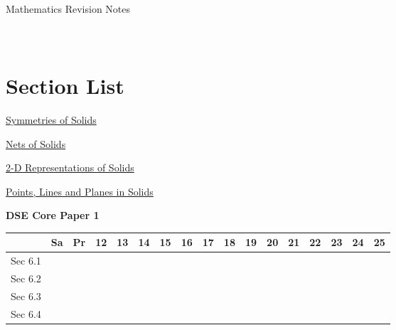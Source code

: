 \documentclass[12pt, a4paper]{article}
\begin{document}
\newpage
\newpage
\thispagestyle{empty}
\begin{center}
Mathematics Revision Notes\\\vspace{1cm}
\\\vspace{1cm}
{\fontsize{24pt}{24pt}\selectfont {More about 3-D Figures}} \\\vspace{1cm}
\label{chapter:S3-6}

\end{center}
\vspace{0.5cm}
\hline
\section*{Section List}
\begin{enumx}[label=Sec 6.\arabic*\ ]
\item \hyperref[section:3-6-1]{Symmetries of Solids}
\item \hyperref[section:3-6-2]{Nets of Solids}
\item \hyperref[section:3-6-3]{2-D Representations of Solids}
\item \hyperref[section:3-6-4]{Points, Lines and Planes in Solids}
\end{enumx}
\begin{absolutelynopagebreak}
\begin{center}
\textbf{DSE Core Paper 1}
\end{center}
\begin{center}
\begin{tabular}{|l|c|c|c|c|c|c|c|c|c|c|c|c|c|c|c|c|}
\hline
        & Sa & Pr & 12 & 13 & 14 & 15 & 16 & 17 & 18 & 19 & 20 & 21 & 22 & 23 & 24 & 25 \\\hline\hline
Sec 6.1 &  &  &  &  &  &  &  &  &  &  &  &  &  &  &  &  \\\hline
Sec 6.2 &  &  &  &  &  &  &  &  &  &  &  &  &  &  &  &  \\\hline
Sec 6.3 &  &  &  &  &  &  &  &  &  &  &  &  &  &  &  &  \\\hline
Sec 6.4 &  &  &  &  &  &  &  &  &  &  &  &  &  &  &  &  \\\hline
\end{tabular}
\end{center}
\end{absolutelynopagebreak}
\end{document}
